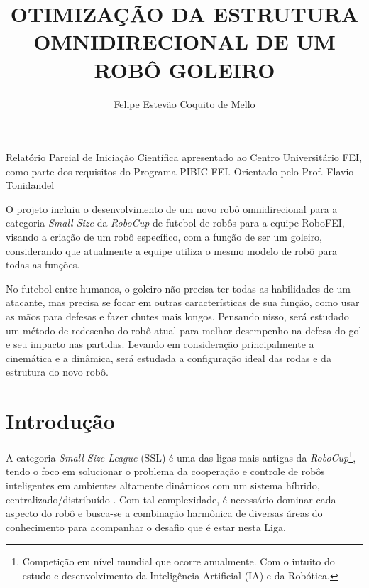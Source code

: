 \documentclass[deposito, acronym, symbols]{fei}
\title{OTIMIZAÇÃO DA ESTRUTURA OMNIDIRECIONAL DE UM ROBÔ GOLEIRO}
\author{Felipe Estevão Coquito de Mello }
\begin{document}
\maketitle

\begin{folhaderosto}
	Relatório Parcial de Iniciação Científica apresentado ao Centro Universitário FEI, como parte dos requisitos do Programa PIBIC-FEI. Orientado pelo Prof. Flavio Tonidandel
\end{folhaderosto}

 \begin{resumo}

O projeto incluiu o desenvolvimento de um novo robô omnidirecional para a categoria \textit{Small-Size} da \textit{RoboCup} de futebol de robôs para a equipe RoboFEI, visando a criação de um robô específico, com a função de ser um goleiro, considerando que atualmente a equipe utiliza o mesmo modelo de robô para todas as funções.

No futebol entre humanos, o goleiro não precisa ter todas as habilidades de um atacante, mas precisa se focar em outras características de sua função, como usar as mãos para defesas e fazer chutes mais longos. Pensando nisso, será estudado um método de redesenho do robô atual para melhor desempenho na defesa do gol e seu impacto nas partidas. Levando em consideração principalmente a cinemática e a dinâmica, será estudada a configuração ideal das rodas e da estrutura do novo robô.



\end{resumo}

\tableofcontents
\listoffigures
\listoftables

\chapter{Introdução}

A categoria \textit{Small Size League} (SSL) é uma das ligas mais antigas da \textit{RoboCup}\footnote[1]{Competição em nível mundial que ocorre anualmente. Com o intuito do estudo e desenvolvimento da Inteligência Artificial (IA) e da Robótica.}, tendo o foco em solucionar o problema da cooperação e controle de robôs inteligentes em ambientes altamente dinâmicos com um sistema híbrido, centralizado/distribuído \cite{about}. Com tal complexidade, é necessário dominar cada aspecto do robô e busca-se a combinação harmônica de diversas áreas do conhecimento para acompanhar o desafio que é estar nesta Liga.
\end{document}
